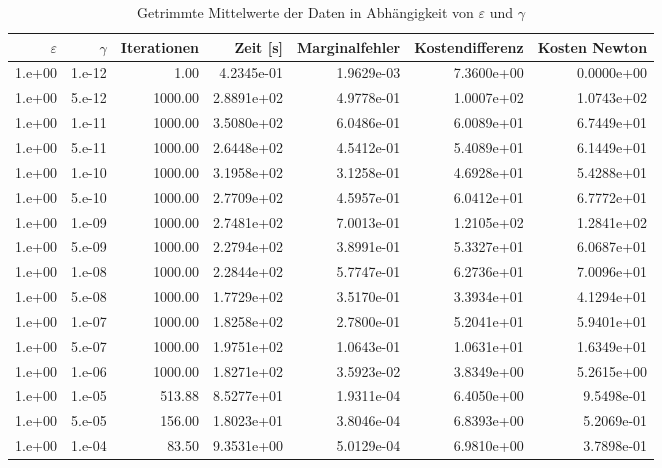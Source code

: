\begin{table}[htbp]
\caption{Getrimmte Mittelwerte der Daten in Abhängigkeit von $\varepsilon$ und $\gamma$}
\label{tab:Parametertest1024}
\small
\centering
{}
\begin{tabular}{rrrrrrr}
\toprule
$\varepsilon$ & $\gamma$ & Iterationen & Zeit [s] & Marginalfehler & Kostendifferenz & Kosten Newton \\
\midrule
1.e+00 & 1.e-12 & 1.00 & 4.2345e-01 & 1.9629e-03 & 7.3600e+00 & 0.0000e+00 \\
1.e+00 & 5.e-12 & 1000.00 & 2.8891e+02 & 4.9778e-01 & 1.0007e+02 & 1.0743e+02 \\
1.e+00 & 1.e-11 & 1000.00 & 3.5080e+02 & 6.0486e-01 & 6.0089e+01 & 6.7449e+01 \\
1.e+00 & 5.e-11 & 1000.00 & 2.6448e+02 & 4.5412e-01 & 5.4089e+01 & 6.1449e+01 \\
1.e+00 & 1.e-10 & 1000.00 & 3.1958e+02 & 3.1258e-01 & 4.6928e+01 & 5.4288e+01 \\
1.e+00 & 5.e-10 & 1000.00 & 2.7709e+02 & 4.5957e-01 & 6.0412e+01 & 6.7772e+01 \\
1.e+00 & 1.e-09 & 1000.00 & 2.7481e+02 & 7.0013e-01 & 1.2105e+02 & 1.2841e+02 \\
1.e+00 & 5.e-09 & 1000.00 & 2.2794e+02 & 3.8991e-01 & 5.3327e+01 & 6.0687e+01 \\
1.e+00 & 1.e-08 & 1000.00 & 2.2844e+02 & 5.7747e-01 & 6.2736e+01 & 7.0096e+01 \\
1.e+00 & 5.e-08 & 1000.00 & 1.7729e+02 & 3.5170e-01 & 3.3934e+01 & 4.1294e+01 \\
1.e+00 & 1.e-07 & 1000.00 & 1.8258e+02 & 2.7800e-01 & 5.2041e+01 & 5.9401e+01 \\
1.e+00 & 5.e-07 & 1000.00 & 1.9751e+02 & 1.0643e-01 & 1.0631e+01 & 1.6349e+01 \\
1.e+00 & 1.e-06 & 1000.00 & 1.8271e+02 & 3.5923e-02 & 3.8349e+00 & 5.2615e+00 \\
1.e+00 & 1.e-05 & 513.88 & 8.5277e+01 & 1.9311e-04 & 6.4050e+00 & 9.5498e-01 \\
1.e+00 & 5.e-05 & 156.00 & 1.8023e+01 & 3.8046e-04 & 6.8393e+00 & 5.2069e-01 \\
1.e+00 & 1.e-04 & 83.50 & 9.3531e+00 & 5.0129e-04 & 6.9810e+00 & 3.7898e-01 \\
\bottomrule
\end{tabular}
\end{table}
